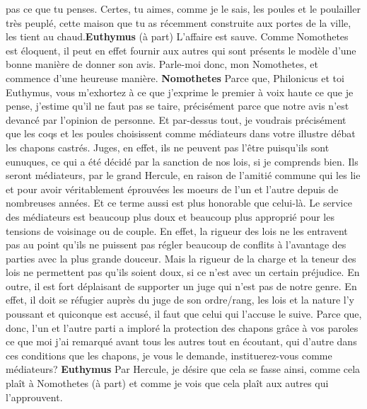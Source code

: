 \documentclass[12pt]{book}
\begin{document}
\begin{pages}
\begin{Rightside}
pas ce que tu penses. Certes, tu aimes, comme je le sais, les poules et le poulailler très peuplé, cette maison que tu as récemment construite aux portes de la ville, les tient au chaud.\pend\pstart\textbf{Euthymus }\hspace{1cm} (à part) L’affaire est sauve. Comme Nomothetes est éloquent, il peut en effet fournir aux autres qui sont présents le modèle d’une bonne manière de donner son avis. 
                        Parle-moi donc, mon Nomothetes, et commence d’une heureuse manière.
                    \pend\pstart\textbf{Nomothetes }\hspace{1cm} Parce que, Philonicus et toi Euthymus, vous m’exhortez à ce que j’exprime le premier à voix haute ce que je pense, j’estime qu’il ne faut pas se taire, précisément parce que notre avis n’est devancé par l’opinion de personne. 
                        Et par-dessus tout, je voudrais précisément que les coqs et les poules choisissent comme médiateurs dans votre illustre débat les chapons castrés. 
                        Juges, en effet, ils ne peuvent pas l’être puisqu’ils sont eunuques, ce qui a été décidé par la sanction de nos lois, si je comprends bien. 
                        Ils seront médiateurs, par le grand Hercule, en raison de l’amitié commune qui les lie et pour avoir véritablement éprouvées les moeurs de l’un et l’autre depuis de nombreuses années. Et ce terme aussi est plus honorable que celui-là. 
                        Le service des médiateurs est beaucoup plus doux et beaucoup plus approprié pour les tensions de voisinage ou de couple. En effet, la rigueur des lois ne les entravent pas au point qu’ils ne puissent pas régler beaucoup de conflits à l’avantage des parties avec la plus grande douceur. Mais la rigueur de la charge et la teneur des lois ne permettent pas qu’ils soient doux, si ce n'est avec un certain préjudice. En outre, il est fort déplaisant de supporter un juge qui n’est pas de notre genre. 
                        En effet, il doit se réfugier auprès du juge de son ordre/rang, les lois et la nature l'y poussant et quiconque est accusé, il faut que celui qui l’accuse le suive. Parce que, donc, l’un et l’autre parti a imploré la protection des chapons grâce à vos paroles ce que moi j’ai remarqué avant tous les autres tout en écoutant, qui d’autre dans ces conditions que les chapons, je vous le demande, instituerez-vous comme médiateurs?
                    \pend\pstart\textbf{Euthymus }\hspace{1cm} Par Hercule, je désire que cela se fasse ainsi, comme cela plaît à Nomothetes (à part) et comme je vois que cela plaît aux autres qui l’approuvent. 

\end{Rightside}
\end{pages}
\end{document}
